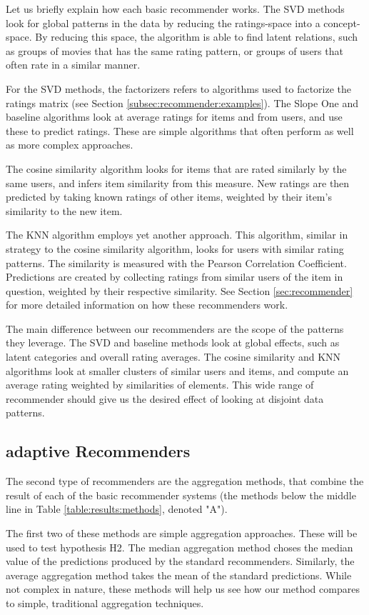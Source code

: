 Let us briefly explain how each basic recommender works.
The SVD methods look for global patterns in the data 
by reducing the ratings-space into a concept-space.
By reducing this space, the algorithm is able to find
latent relations, such as groups of movies that has the same
rating pattern, or groups of users that often rate in a similar manner.

For the SVD methods, the factorizers refers to algorithms used to factorize the ratings matrix
(see Section \ref{subsec:recommender:examples}).
The Slope One and baseline algorithms look at average
ratings for items and from users, and use these to predict ratings.
These are simple algorithms that often perform as well
as more complex approaches.

The cosine similarity algorithm looks for items that are rated
similarly by the same users, and infers item similarity from this measure.
New ratings are then predicted by taking known ratings of other items,
weighted by their item's similarity to the new item.

The KNN algorithm employs yet another approach. This algorithm,
similar in strategy to the cosine similarity algorithm,
looks for users with similar rating patterns.
The similarity is measured with the Pearson Correlation Coefficient.
Predictions are created by collecting ratings from similar users
of the item in question, weighted by their respective similarity.
See Section \ref{sec:recommender} for more 
detailed information on how these recommenders work. 

The main difference between our recommenders are the scope of the patterns they leverage.
The SVD and baseline methods look at global effects, such as latent categories
and overall rating averages.
The cosine similarity and KNN algorithms look at smaller clusters of similar
users and items, and compute an average rating weighted by 
similarities of elements.
This wide range of recommender should give us the desired
effect of looking at disjoint data patterns.


\subsection{adaptive Recommenders}

The second type of recommenders are the aggregation methods, 
that combine the result of each of the basic recommender systems
(the methods below the middle line in Table \ref{table:results:methods},
denoted "A").

The first two of these methods are simple aggregation approaches.
These will be used to test hypothesis H2.
The median aggregation method choses the median value of the predictions
produced by the standard recommenders.
Similarly, the average aggregation method takes the mean of the
standard predictions.
While not complex in nature, these methods
will help us see how our method compares to simple, traditional
aggregation techniques.

